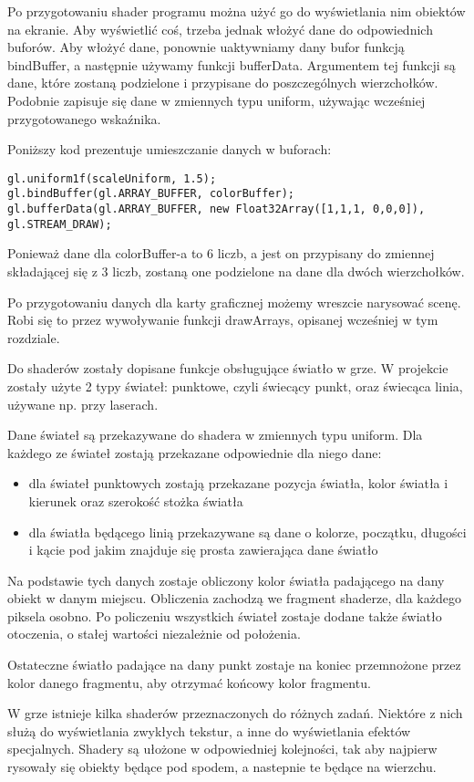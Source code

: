 Po przygotowaniu shader programu można użyć go do wy\'swietlania nim obiektów na ekranie. Aby wy\'swietlić co\'s, trzeba jednak włożyć dane do odpowiednich buforów. Aby włożyć dane, ponownie uaktywniamy dany bufor funkcją bindBuffer, a następnie używamy funkcji bufferData. Argumentem tej funkcji są dane, które zostaną podzielone i przypisane do poszczególnych wierzchołków. Podobnie zapisuje się dane w zmiennych typu uniform, używając wcze\'sniej przygotowanego wskaźnika.

Poniższy kod prezentuje umieszczanie danych w buforach:
\begin{lstlisting}
gl.uniform1f(scaleUniform, 1.5);
gl.bindBuffer(gl.ARRAY_BUFFER, colorBuffer);
gl.bufferData(gl.ARRAY_BUFFER, new Float32Array([1,1,1, 0,0,0]), gl.STREAM_DRAW);
\end{lstlisting}

Ponieważ dane dla colorBuffer-a to 6 liczb, a jest on przypisany do zmiennej składającej się z 3 liczb, zostaną one podzielone na dane dla dwóch wierzchołków.

Po przygotowaniu danych dla karty graficznej możemy wreszcie narysować scenę. Robi się to przez wywoływanie funkcji drawArrays, opisanej wcze\'sniej w tym rozdziale.\bigskip


Do shaderów zostały dopisane funkcje obsługujące \'swiatło w grze. W projekcie zostały użyte 2 typy \'swiateł: punktowe, czyli \'swiecący punkt, oraz \'swiecąca linia, używane np. przy laserach.

Dane \'swiateł są przekazywane do shadera w zmiennych typu uniform. Dla każdego ze \'swiateł zostają przekazane odpowiednie dla niego dane:\begin{itemize}[topsep=0.2em, itemsep=0.5em, partopsep=0em, parsep=0em]
	\item dla \'swiateł punktowych zostają przekazane pozycja \'swiatła, kolor \'swiatła i kierunek oraz szeroko\'sć stożka \'swiatła
	\item dla \'swiatła będącego linią przekazywane są dane o kolorze, początku, długo\'sci i kącie pod jakim znajduje się prosta zawierająca dane \'swiatło
\end{itemize}

Na podstawie tych danych zostaje obliczony kolor \'swiatła padającego na dany obiekt w danym miejscu. Obliczenia zachodzą we fragment shaderze, dla każdego piksela osobno. Po policzeniu wszystkich \'swiateł zostaje dodane także \'swiatło otoczenia, o stałej warto\'sci niezależnie od położenia.

Ostateczne \'swiatło padające na dany punkt zostaje na koniec przemnożone przez kolor danego fragmentu, aby otrzymać końcowy kolor fragmentu.\bigskip

\smallskip

W grze istnieje kilka shaderów przeznaczonych do różnych zadań. Niektóre z nich służą do wy\'swietlania zwykłych tekstur, a inne do wy\'swietlania efektów specjalnych. Shadery są ułożone w odpowiedniej kolejno\'sci, tak aby najpierw rysowały się obiekty będące pod spodem, a nastepnie te będące na wierzchu.

\cleardoublepage